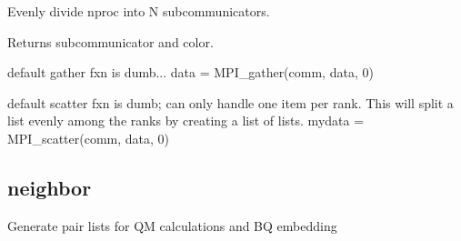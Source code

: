 \documentclass[letterpaper,10pt,english]{sphinxmanual}
\begin{document}

\begin{fulllineitems}
\label{\detokenize{globals:Globals.MPI.create_split_comms}}
Evenly divide nproc into N subcommunicators.

Returns subcommunicator and color.

\end{fulllineitems}


\begin{fulllineitems}
\label{\detokenize{globals:Globals.MPI.gather}}
default gather fxn is dumb...
data = MPI\_gather(comm, data, 0)

\end{fulllineitems}


\begin{fulllineitems}
\label{\detokenize{globals:Globals.MPI.scatter}}
default scatter fxn is dumb; can only handle one item per rank.  This
will split a list evenly among the ranks by creating a list of lists.
mydata = MPI\_scatter(comm, data, 0)

\end{fulllineitems}



\subsection{neighbor}
\label{\detokenize{globals:module-Globals.neighbor}}\label{\detokenize{globals:neighbor}}
Generate pair lists for QM calculations and BQ embedding
\end{document}
